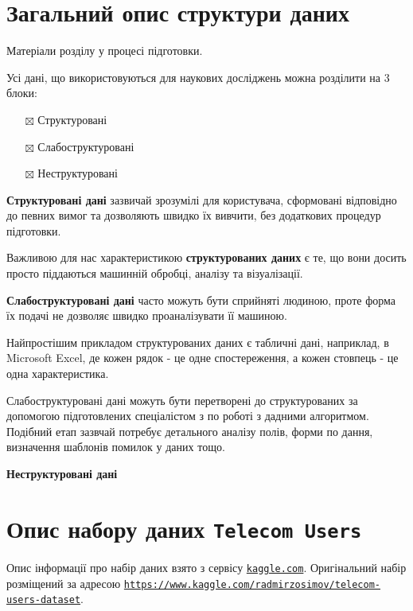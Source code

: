 \documentclass[
]{book}
\providecommand{\tightlist}{%
  \setlength{\itemsep}{0pt}\setlength{\parskip}{0pt}}
\begin{document}
\hypertarget{chapter41}{%
\section{Загальний опис структури даних}\label{chapter41}}

Матеріали розділу у процесі підготовки.

Усі дані, що використовуються для наукових досліджень можна розділити на 3 блоки:

\begin{itemize}
\tightlist
\item[$\boxtimes$]
  Структуровані
\item[$\boxtimes$]
  Слабоструктуровані
\item[$\boxtimes$]
  Неструктуровані
\end{itemize}

\textbf{Структуровані дані} зазвичай зрозумілі для користувача, сформовані відповідно до певних вимог та дозволяють швидко їх вивчити, без додаткових процедур підготовки.

Важливою для нас характеристикою \textbf{структурованих даних} є те, що вони досить просто піддаються машинній обробці, аналізу та візуалізації.

\textbf{Слабоструктуровані дані} часто можуть бути сприйняті людиною, проте форма їх подачі не дозволяє швидко проаналізувати її машиною.

Найпростішим прикладом структурованих даних є табличні дані, наприклад, в Microsoft Excel, де кожен рядок - це одне спостереження, а кожен стовпець - це одна характеристика.

Слабоструктуровані дані можуть бути перетворені до структурованих за допомогою підготовлених спеціалістом з по роботі з дадними алгоритмом. Подібний етап зазвчай потребує детального аналізу полів, форми по дання, визначення шаблонів помилок у даних тощо.

\textbf{Неструктуровані дані}

\hypertarget{chapter42}{%
\section{\texorpdfstring{Опис набору даних \texttt{Telecom\ Users}}{Опис набору даних Telecom Users}}\label{chapter42}}

Опис інформації про набір даних взято з сервісу \href{https://kaggle.com}{\texttt{kaggle.com}}.
Оригінальний набір розміщений за адресою \href{https://www.kaggle.com/radmirzosimov/telecom-users-dataset}{\texttt{https://www.kaggle.com/radmirzosimov/telecom-users-dataset}}.
\end{document}
